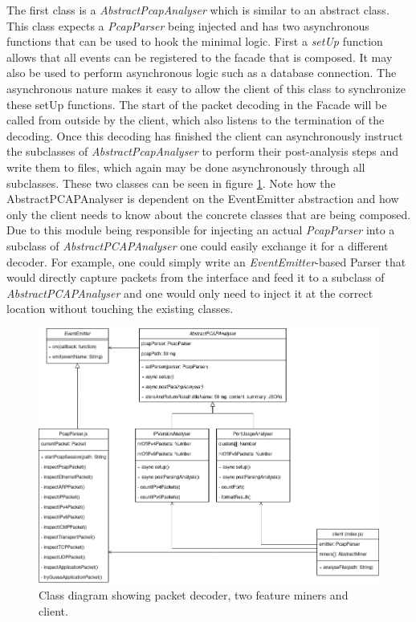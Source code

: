 The first class is a \textit{AbstractPcapAnalyser} which is similar to an abstract class. This class expects a  \textit{PcapParser} being injected and has two asynchronous functions that can be used to hook the minimal logic. First a \textit{setUp} function allows that all events can be registered to the facade that is composed. It may also be used to perform asynchronous logic such as a database connection. The asynchronous nature makes it easy to allow the client of this class to synchronize these setUp functions.
The start of the packet decoding in the Facade will be called from outside by the client, which also listens to the termination of the decoding. Once this decoding has finished the client can asynchronously instruct the subclasses of \textit{AbstractPcapAnalyser} to perform their post-analysis steps and write them to files, which again may be done asynchronously through all subclasses.
These two classes can be seen in figure \ref{fig:classdiagrambackend}. Note how the AbstractPCAPAnalyser is dependent on the EventEmitter abstraction and how only the client needs to know about the concrete classes that are being composed. Due to this module being responsible for injecting an actual \textit{PcapParser} into a subclass of \textit{AbstractPCAPAnalyser} one could easily exchange it for a different decoder. For example, one could simply write an \textit{EventEmitter}-based Parser that would directly capture packets from the interface and feed it to a subclass of \textit{AbstractPCAPAnalyser} and one would only need to inject it at the correct location without touching the existing classes.
\begin{figure}
    \centering
    \includegraphics[width=14cm]{images/backend-miners(2).png}
    \caption{Class diagram showing packet decoder, two feature miners and client.}
    \label{fig:classdiagrambackend}
\end{figure}
